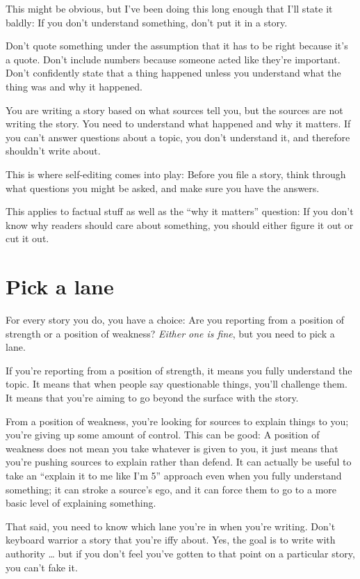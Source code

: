 \documentclass[
  11pt,
  american,
  letterpaperpaper,
  extrafontsizes,onecolumn,openright
  ]{memoir}
\newlength{\rf}
\begin{document}
This might be obvious, but I've been doing this long enough that I'll state it baldly: If you don't understand something, don't put it in a story.

Don't quote something under the assumption that it has to be right because it's a quote. Don't include numbers because someone acted like they're important. Don't confidently state that a thing happened unless you understand what the thing was and why it happened.

You are writing a story based on what sources tell you, but the sources are not writing the story. You need to understand what happened and why it matters. If you can't answer questions about a topic, you don't understand it, and therefore shouldn't write about.

This is where self-editing comes into play: Before you file a story, think through what questions you might be asked, and make sure you have the answers.

This applies to factual stuff as well as the \enquote{why it matters} question: If you don't know why readers should care about something, you should either figure it out or cut it out.

\hypertarget{pick-a-lane}{%
\section*{Pick a lane}\label{pick-a-lane}}

For every story you do, you have a choice: Are you reporting from a position of strength or a position of weakness? \emph{Either one is fine}, but you need to pick a lane.

If you're reporting from a position of strength, it means you fully understand the topic. It means that when people say questionable things, you'll challenge them. It means that you're aiming to go beyond the surface with the story.

From a position of weakness, you're looking for sources to explain things to you; you're giving up some amount of control. This can be good: A position of weakness does not mean you take whatever is given to you, it just means that you're pushing sources to explain rather than defend. It can actually be useful to take an \enquote{explain it to me like I'm 5} approach even when you fully understand something; it can stroke a source's ego, and it can force them to go to a more basic level of explaining something.

That said, you need to know which lane you're in when you're writing. Don't keyboard warrior a story that you're iffy about. Yes, the goal is to write with authority \ldots{} but if you don't feel you've gotten to that point on a particular story, you can't fake it.
\end{document}
